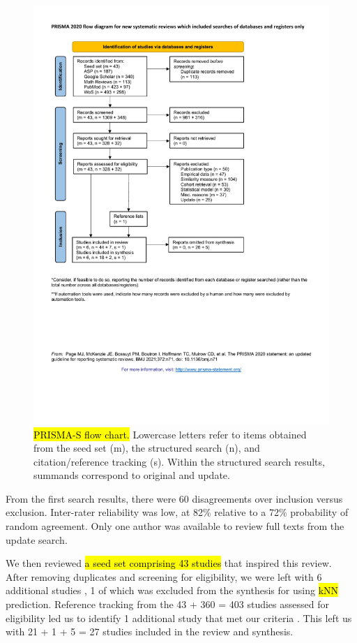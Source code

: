 \documentclass[sn-mathphys,Numbered,pdflatex]{sn-jnl}
\theoremstyle{remark}
\theoremstyle{definition}
\begin{document}
\begin{figure}

{\centering \includegraphics[width=0.8\linewidth]{Fig1} 

}

\caption{\hl{PRISMA-S flow chart.}
 Lowercase letters refer to items obtained from
 the seed set (m),
 the structured search (n), and
 citation/reference tracking (s).
 Within the structured search results,
 summands correspond to original and update.}\label{fig:prisma}
\end{figure}

From the first search results, there were 60 disagreements over
inclusion versus exclusion. Inter-rater reliability was low, at 82\%
relative to a 72\% probability of random agreement. Only one author was
available to review full texts from the update search.

We then reviewed \hl{a seed set comprising 43 studies} that inspired
this review. After removing duplicates and screening for eligibility, we
were left with 6 additional studies
\citep{Park2006, Lowsky2013, Lee2015, Ng2015, Lee2017, Wang2019}, 1 of
which was excluded from the synthesis for using \hl{kNN} prediction.
Reference tracking from the 43 + 360 = 403 studies assessed for
eligibility led us to identify 1 additional study that met our criteria
\citep{Kasabov2010}. This left us with 21 + 1 + 5 = 27 studies included
in the review and synthesis.
\end{document}
